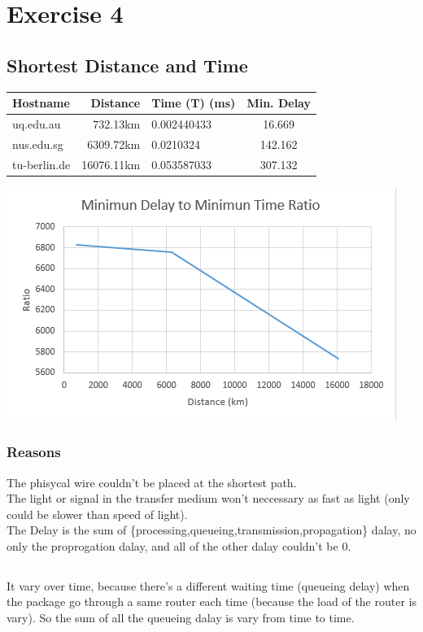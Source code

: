 \documentclass{article}
\begin{document}
\section{Exercise 4}

\subsection{Shortest Distance and Time}


\begin{tabular}{|l|r|l|c|}
    \hline
    Hostname & Distance & Time (T) (ms) & Min. Delay\\
    \hline
    uq.edu.au   &   732.13km& 0.002440433&16.669\\
    nus.edu.sg  &  6309.72km& 0.0210324  &142.162\\
    tu-berlin.de& 16076.11km& 0.053587033&307.132\\
    \hline
\end{tabular}

\includegraphics[width=\textwidth]{ratio.png}

\subsubsection{Reasons}
The phisycal wire couldn't be placed at the shortest path. \\
The light or signal in the transfer medium won't neccessary as fast as light (only could be slower than speed of light).\\
The Delay is the sum of \{processing,queueing,transmission,propagation\} dalay, no only the proprogation dalay, and all of the other dalay couldn't be 0.

\subsection{}
It vary over time, because there's a different waiting time (queueing delay) when the package go through a same router each time (because the load of the router is vary). So the sum of all the queueing dalay is vary from time to time.
\end{document}
